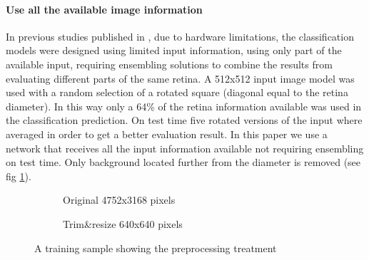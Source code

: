 \documentclass[preprint]{elsarticle}
\theoremstyle{definition} %
\theoremstyle{remark}
\begin{document}
\paragraph{Use all the available image information} In previous studies published in \cite{jdelatorre-2016}, due to hardware limitations, the classification models were designed using limited input information, using only part of the available input, requiring ensembling solutions to combine the results from evaluating different parts of the same retina. A 512x512 input image model was used with a random selection of a rotated square (diagonal equal to the retina diameter). In this way only a 64\% of the retina information available was used in the classification prediction. On test time five rotated versions of the input where averaged in order to get a better evaluation result. In this paper we use a network that receives all the input information available not requiring ensembling on test time. Only background located further from the diameter is removed (see fig \ref{fig:preprocessing}).

\begin{figure}[h]
	\centering
	\begin{subfigure}[b]{.45\textwidth}
			\centering
			\caption{Original 4752x3168 pixels}	
	\end{subfigure}
	\begin{subfigure}[b]{.40\textwidth}
			\centering
			\caption{Trim\&resize 640x640 pixels}
	\end{subfigure}
	\caption{A training sample showing the preprocessing treatment}
	\label{fig:preprocessing}
\end{figure}
\end{document}
